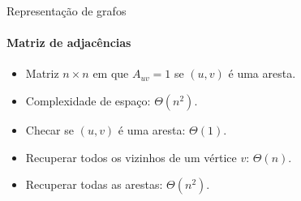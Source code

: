 \begin{frame}[t]{Representação de grafos}
	\framesubtitle{Matriz de adjacências}
	
	\begin{itemize}
		\item {\color{magenta}Matriz $n \times n$ em que $A_{uv} = 1$ se $(u, v)$ é uma aresta.}
		\item Complexidade de espaço: $\Theta(n^2)$.
		\item Checar se $(u, v)$ é uma aresta: $\Theta(1)$.
		\item Recuperar todos os vizinhos de um vértice $v$: $\Theta(n)$.
		\item Recuperar todas as arestas: $\Theta(n^2)$.
	\end{itemize}
	
	\pause
	
	\begin{columns}[c]
		\begin{column}{0.18\textwidth}\end{column}
		\begin{column}{0.6\textwidth}

			\begin{columns}[c]		
			
\end{columns}
\end{column}
\end{columns}
\end{frame}
